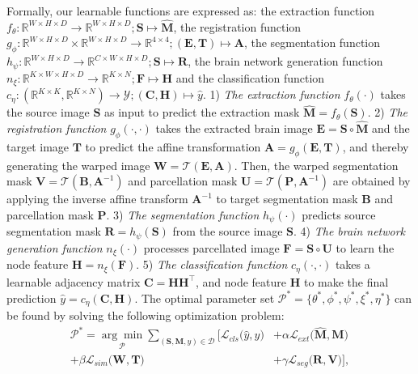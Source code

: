Formally, our learnable functions are expressed as: the extraction function $f_{\theta}: \mathbb{R}^{W \times H \times D} \rightarrow \mathbb{R}^{W \times H \times D} ; \mathbf{S} \mapsto \hat{\mathbf{M}}$, the registration function $g_{\phi}: \mathbb{R}^{W \times H \times D}\times \mathbb{R}^{W \times H \times D} \rightarrow \mathbb{R}^{4 \times 4} ; (\mathbf{E},\mathbf{T}) \mapsto \mathbf{A}$, the segmentation function $h_{\psi}: \mathbb{R}^{W \times H \times D} \rightarrow \mathbb{R}^{C \times W \times H \times D} ; \mathbf{S} \mapsto \mathbf{R} $, the brain network generation function $n_{\xi}: \mathbb{R}^{K \times W \times H \times D} \rightarrow \mathbb{R}^{K \times N} ; \mathbf{F} \mapsto \mathbf{H} $ and the classification function $c_{\eta}: (\mathbb{R}^{K \times K}, \mathbb{R}^{K \times N}) \rightarrow \mathcal{Y} ; (\mathbf{C},\mathbf{H}) \mapsto \hat{y}$. 
1) \textit{The extraction function} $f_{\theta}(\cdot)$ takes the source
image $\mathbf{S}$ as input to predict the extraction mask $\hat{\mathbf{M}} = f_{\theta}(\mathbf{S})$. 
2) \textit{The registration function} $g_{\phi}(\cdot, \cdot)$ takes the extracted brain image $\mathbf{E} = \mathbf{S} \circ \hat{\mathbf{M}}$ and the target image $\mathbf{T}$ to predict the affine transformation $\mathbf{A} = g_{\phi}(\mathbf{E},\mathbf{T})$, and thereby generating the warped image $\mathbf{W} = \mathcal{T}(\mathbf{E},\mathbf{A})$. Then, the warped segmentation mask $\mathbf{V} = \mathcal{T}(\mathbf{B},\mathbf{A}^{-1})$ 
and parcellation mask $\mathbf{U} = \mathcal{T}(\mathbf{P},\mathbf{A}^{-1})$ are obtained by applying the inverse affine transform $\mathbf{A}^{-1}$ to target segmentation mask $\mathbf{B}$ and parcellation mask $\mathbf{P}$. 
3) \textit{The segmentation function} $h_{\psi}(\cdot)$ predicts source segmentation mask $\mathbf{R} = h_{\psi}(\mathbf{S})$ from the source image $\mathbf{S}$. 
4) \textit{The brain network generation function} $n_{\xi}(\cdot)$ processes parcellated image $\mathbf{F}=\mathbf{S} \circ \mathbf{U}$ to learn the node feature $\mathbf{H} = n_{\xi}(\mathbf{F})$. 
5) \textit{The classification function} $c_{\eta}(\cdot,\cdot)$ takes a learnable adjacency matrix $\mathbf{C} = \mathbf{H} \mathbf{H^\top}$, and node feature $\mathbf{H}$ to make the final prediction $\hat{y}=c_{\eta}(\mathbf{C},\mathbf{H})$.
The optimal parameter set $\mathcal{P^*} = \{\theta^*, \phi^*, \psi^*, \xi^*, \eta^*\}$ can be found by solving the following optimization problem:
\begin{equation}
\label{eq:optimization}
\begin{aligned}
\mathcal{P^*} = \underset{\mathcal{P}}{\arg \min} \sum_{(\mathbf{S}, \mathbf{M}, y)\in \mathcal{D}} \Big[ \mathcal{L}_{cls}\big(\hat{y}, y\big)  & + \alpha \mathcal{L}_{ext}\big(\hat{\mathbf{M}}, \mathbf{M}\big) \\   + \beta  \mathcal{L}_{sim}\big(\mathbf{W}, \mathbf{T}\big)   & + \gamma \mathcal{L}_{seg}\big({\mathbf{R}}, \mathbf{V}\big)\Big],
\end{aligned}
\end{equation}
